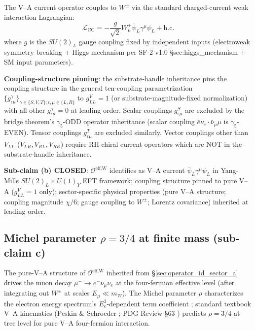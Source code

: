 \documentclass[11pt,letterpaper]{article}
\newcommand{\OeffW}{\mathcal{O}^{\text{eff,W}}}
\begin{document}
The V--A current operator couples to $W^\pm$ via the standard charged-current weak interaction Lagrangian:
\begin{equation}
\mathcal{L}_{\text{CC}} = -\frac{g}{\sqrt{2}} W^+_\mu \bar{\psi}_L \gamma^\mu \psi_L + \text{h.c.}
\label{eq:CC_Lagrangian}
\end{equation}
where $g$ is the $SU(2)_L$ gauge coupling fixed by independent inputs (electroweak symmetry breaking + Higgs mechanism per SF-2 v1.0 §sec:higgs\_mechanism \cite{SF2v1} + SM input parameters).

\textbf{Coupling-structure pinning}: the substrate-handle inheritance pins the coupling structure in the general ten-coupling parametrization $\{g^\gamma_{\epsilon\mu}\}_{\gamma \in \{S,V,T\}; \epsilon,\mu \in \{L,R\}}$ to $g^V_{LL} = 1$ (or substrate-magnitude-fixed normalization) with all other $g^\gamma_{\epsilon\mu} = 0$ at leading order. Scalar couplings $g^S_{\epsilon\mu}$ are excluded by the bridge theorem's $\gamma_5$-ODD operator inheritance (scalar coupling $\bar{e}\nu_e \cdot \bar{\nu}_\mu \mu$ is $\gamma_5$-EVEN). Tensor couplings $g^T_{\epsilon\mu}$ are excluded similarly. Vector couplings other than $V_{LL}$ ($V_{LR}, V_{RL}, V_{RR}$) require RH-chiral current operators which are NOT in the substrate-handle inheritance.

\textbf{Sub-claim (b) CLOSED}: $\OeffW$ identifies as V--A current $\bar{\psi}_L \gamma^\mu \psi_L$ in Yang-Mills $SU(2)_L \times U(1)_Y$ EFT framework; coupling structure pinned to pure V--A ($g^V_{LL} = 1$ only); sector-specific physical properties (pure V--A structure; coupling magnitude $\chi/6$; gauge coupling to $W^\pm$; Lorentz covariance) inherited at leading order.

\subsection{Michel parameter $\rho = 3/4$ at finite mass (sub-claim c)}
\label{sec:michel_parameter}

The pure-V--A structure of $\OeffW$ inherited from §\ref{sec:operator_id_sector_a} drives the muon decay $\mu^- \to e^- \nu_\mu \bar{\nu}_e$ at the four-fermion effective level (after integrating out $W^\pm$ at scales $E_\mu \ll m_W$). The Michel parameter $\rho$ characterizes the electron energy spectrum's $E_e^3$-dependent term coefficient \cite{Michel1950, CommonsBucksbaum, ChengLi}; standard textbook V--A kinematics (Peskin \& Schroeder \cite{Peskin}; PDG Review §63 \cite{PDG2024}) predicts $\rho = 3/4$ at tree level for pure V--A four-fermion interaction.
\end{document}
